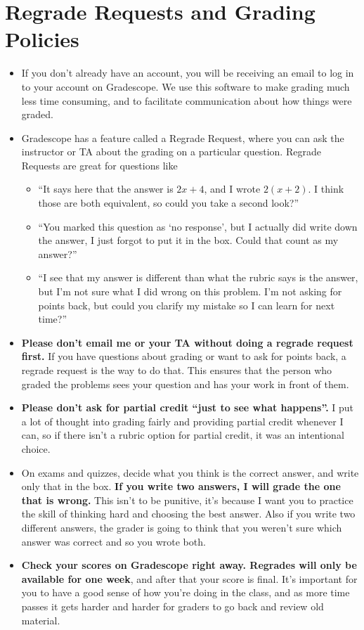 \documentclass[11pt,letterpaper]{article}
\begin{document}
\section*{Regrade Requests and Grading Policies}
\begin{itemize}[nosep]
\item If you don’t already have an account, you will be receiving an email to log in to your account on Gradescope. We use this software to make grading much less time consuming, and to facilitate communication about how things were graded. 
\item Gradescope has a feature called a Regrade Request, where you can ask the instructor or TA about the grading on a particular question. Regrade Requests are great for questions like
  \begin{itemize}[nosep, label={$\circ$}]
  \item “It says here that the answer is $2x+4$, and I wrote $2(x+2)$. I think those are both equivalent, so could you take a second look?”
  \item “You marked this question as ‘no response’, but I actually did write down the answer, I just forgot to put it in the box. Could that count as my answer?”
  \item “I see that my answer is different than what the rubric says is the answer, but I’m not sure what I did wrong on this problem. I’m not asking for points back, but could you clarify my mistake so I can learn for next time?”
  \end{itemize}
\item \textbf{Please don’t email me or your TA without doing a regrade request first.} If you have questions about grading or want to ask for points back, a regrade request is the way to do that. This ensures that the person who graded the problems sees your question and has your work in front of them.
\item \textbf{Please don’t ask for partial credit “just to see what happens”.} I put a lot of thought into grading fairly and providing partial credit whenever I can, so if there isn’t a rubric option for partial credit, it was an intentional choice. 
\item On exams and quizzes, decide what you think is the correct answer, and write only that in the box. \textbf{If you write two answers, I will grade the one that is wrong.} This isn’t to be punitive, it’s because I want you to practice the skill of thinking hard and choosing the best answer. Also if you write two different answers, the grader is going to think that you weren’t sure which answer was correct and so you wrote both. 
\item \textbf{Check your scores on Gradescope right away. Regrades will only be available for one week}, and after that your score is final. It's important for you to have a good sense of how you're doing in the class, and as more time passes it gets harder and harder for graders to go back and review old material. 
\end{itemize}
\end{document}
